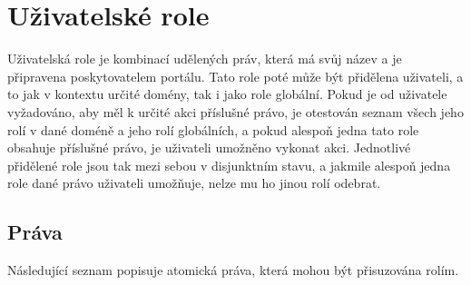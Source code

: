 \section{Uživatelské role}
Uživatelská role je kombinací udělených práv, která má svůj název a je připravena poskytovatelem portálu. Tato role poté může být přidělena uživateli, a to jak v kontextu určité domény, tak i jako role globální. Pokud je od uživatele vyžadováno, aby měl k určité akci příslušné právo, je otestován seznam všech jeho rolí v dané doméně a jeho rolí globálních, a pokud alespoň jedna tato role obsahuje příslušné právo, je uživateli umožněno vykonat akci. Jednotlivé přidělené role jsou tak mezi sebou v disjunktním stavu, a jakmile alespoň jedna role dané právo uživateli umožňuje, nelze mu ho jinou rolí odebrat.

\subsection{Práva}
Následující seznam popisuje atomická práva, která mohou být přisuzována rolím.

